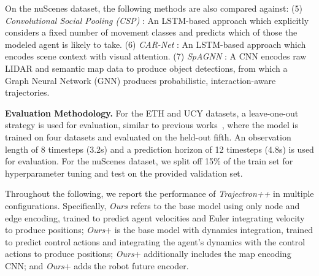 \documentclass[runningheads]{llncs}
\newcommand{\algname}{\mbox{Trajectron++}}
\newcommand{\emphalgname}{\emph{\algname}}
\begin{document}
On the nuScenes dataset, the following methods are also compared against: 
(5) \textit{Convolutional Social Pooling (CSP)} \cite{DeoTrivedi2018}: An LSTM-based approach which explicitly considers a fixed number of movement classes and predicts which of those the modeled agent is likely to take. 
(6) \textit{CAR-Net} \cite{SadeghianLegrosEtAl2018}: An LSTM-based approach which encodes scene context with visual attention. 
(7) \textit{SpAGNN} \cite{CasasGulinoEtAl2019}: A CNN encodes raw LIDAR and semantic map data to produce object detections, from which a Graph Neural Network (GNN) produces probabilistic, interaction-aware trajectories.

{\bf Evaluation Methodology.} For the ETH and UCY datasets, a leave-one-out strategy is used for evaluation, similar to previous works~\cite{AlahiGoelEtAl2016,GuptaJohnsonEtAl2018,IvanovicPavone2019,KosarajuSadeghianEtAl2019,SadeghianKosarajuEtAl2019,ZhaoXuEtAl2019}, where the model is trained on four datasets and evaluated on the held-out fifth. An observation length of 8 timesteps (3.2s) and a prediction horizon of 12 timesteps (4.8s) is used for evaluation. 
For the nuScenes dataset, we split off 15\% of the train set for hyperparameter tuning and test on the provided validation set.


Throughout the following, we report the performance of \emphalgname{} in multiple configurations. Specifically, \textit{Ours} refers to the base model using only node and edge encoding, trained to predict agent velocities and Euler integrating velocity to produce positions; 
\textit{Ours}+ is the base model with dynamics integration, trained to predict control actions and integrating the agent's dynamics with the control actions to produce positions; 
\textit{Ours}+ additionally includes the map encoding CNN; and \textit{Ours}+ adds the robot future encoder.
\end{document}
